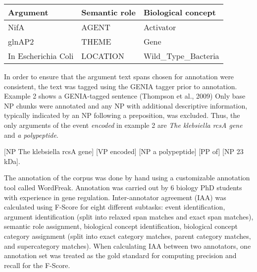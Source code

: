 \documentclass[11pt]{article}
\begin{document}
\begin{center}
\begin{tabular}{l l l}
\hline
{\bf Argument} & {\bf Semantic role} & {\bf Biological concept} \\ \hline
NifA & AGENT & Activator \\ \hline
glnAP2 & THEME & Gene \\ \hline
In Escherichia Coli & LOCATION & Wild\_Type\_Bacteria \\ \hline
\end{tabular}
\label{tab:labels}
\end{center}


In order to ensure that the argument text spans chosen for annotation were consistent, the text was tagged using the GENIA tagger prior to annotation.  Example 2 shows a GENIA-tagged sentence (Thompson et al., 2009)  Only base NP chunks were annotated and any NP with additional descriptive information, typically indicated by an NP following a preposition,  was excluded.  Thus, the only arguments of the event {\it encoded} in example 2 are {\it The klebsiella rcsA gene} and {\it a polypeptide}.

\begin{exe}
	\ex $[$NP The klebsiella rcsA gene] [VP encoded] [NP a polypeptide] [PP of] [NP 23 kDa].
\end{exe}





The annotation of the corpus was done by hand using a customizable annotation tool called WordFreak.  Annotation was carried out by 6 biology PhD students with experience in gene regulation.  Inter-annotator agreement (IAA) was calculated using F-Score for eight different subtasks: event identification, argument identification (split into relaxed span matches and exact span matches), semantic role assignment, biological concept identification, biological concept category assignment (split into exact category matches, parent category matches, and supercategory matches).  When calculating IAA between two annotators, one annotation set was treated as the gold standard for computing precision and recall for the F-Score.  
\end{document}
